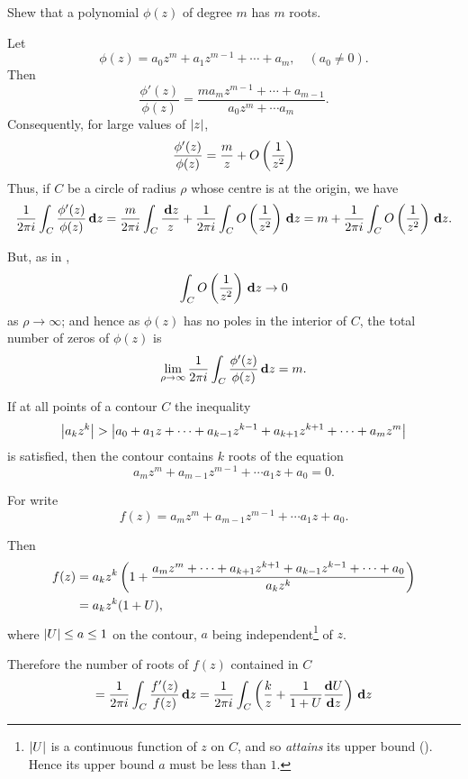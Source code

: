 %
%
\begin{wandwexample}
  Shew that a polynomial $\phi(z)$ of degree $m$ has $m$ roots.

Let
$$
\phi(z)
=
a_{0} z^{m} + a_{1} z^{m-1} + \cdots + a_{m},
\quad
(a_{0} \neq 0).
$$
Then
$$
\frac{ \phi'(z) }{ \phi(z) }
=
\frac{ m a_{m}z^{m-1} + \cdots + a_{m-1} }{ a_{0}z^{m} + \cdots a_{m}}.
$$
Consequently, for large values of $\left| z \right|$,
$$
\frac{ \phi'(z) }{ \phi(z) }
=
\frac{m}{z} + O\left(  \frac{1}{z^{2}}  \right)
$$
Thus, if $C$ be a circle of radius $\rho$ whose centre is at the origin, we
have
$$
\frac{1}{2 \pi i} \int_{C} \frac{\phi'(z)}{\phi(z)} \, \mathbf{d} z
=
\frac{m}{2 \pi i} \int_{C} \frac{ \, \mathbf{d} z }{z}
+
\frac{1}{2 \pi i} \int_{C} O\left(  \frac{1}{z^{2}}  \right) \, \mathbf{d} z
=
m + \frac{1}{2 \pi i} \int_{C} O\left(  \frac{1}{z^{2}}  \right) \, \mathbf{d} z.
$$

But, as in ,
$$
\int_{C} O\left(  \frac{1}{z^{2}}  \right) \, \mathbf{d} z
\rightarrow
0
$$
as $\rho\rightarrow\infty$; and hence as $\phi(z)$ has no poles in the
interior of $C$, the total number of zeros of $\phi(z)$ is
$$
\lim_{\rho\rightarrow\infty}
\frac{1}{2\pi i}
\int_{C} \frac{ \phi'(z) }{\phi(z)} \, \mathbf{d} z
=
m.
$$
\end{wandwexample}
If at all points of a contour $C$ the inequality
$$
\left|  a_{k} z^{k}  \right|
>
\left| 
  a_{0}
  + a_{1} z
  + \cdots
  + a_{k-1} z^{k-1}
  + a_{k+1} z^{k+1}
  + \cdots
  + a_{m} z^{m}
 \right|
$$
is satisfied, then the contour contains $k$ roots of the equation
$$
a_{m} z^{m} + a_{m-1} z^{m-1} + \cdots a_{1} z + a_{0} = 0.
$$

For write
$$
f(z)
=
a_{m} z^{m} + a_{m-1} z^{m-1} + \cdots a_{1} z + a_{0}.
$$

Then
\begin{align*}
  f(z)
  &=
  a_{k} z^{k}
  \left(  1 +
    \frac{ a_{m}z^{m}
      + \cdots
      + a_{k+1}z^{k+1}
      + a_{k-1}z^{k-1}
      + \cdots
      + a_{0}
    }{ a_{k} z^{k} }
   \right)
  \\
  &= a_{k} z^{k} (1 + U),
\end{align*}
where $\left| U \right| \leq a \leq 1$ on the contour, $a$ being
independent\footnote{$\left| U \right|$ is a continuous function of $z$ on
  $C$, and so \emph{attains} its upper bound
  (). Hence its upper bound $a$ must be
  less than $1$.} of $z$.

Therefore the number of roots of $f(z)$ contained in $C$
$$
= \frac{1}{2 \pi i} \int_{C} \frac{f'(z)}{f(z)} \, \mathbf{d} z
= \frac{1}{2 \pi i}
\int_{C} \left(  \frac{k}{z}
  + \frac{1}{1+U} \frac{ \mathbf{d} U }{ \mathbf{d} z }
 \right) \, \mathbf{d} z
$$

